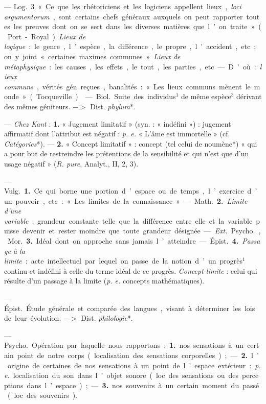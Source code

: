 \begin{itemize}[leftmargin=1cm, label=, itemsep=1pt]
— \si{Log.} 3 « Ce que les rhétoriciens et les logiciens appellent lieux,
{\it loci argumentorum}, sont certains chefs généraux auxquels on peut
rapporter toutes les preuves dont on se sert dans les diverses matières que
l’on traite » (Port-Royal). {\it Lieux de logique} : le genre, l’espèce, la
différence, le propre, l'accident, etc. ; on y joint « certaines maximes
communes ». {\it Lieux de métaphysique} : les causes, les effets, le tout,
les parties, etc. — D'où : {\it lieux communs}, vérités gén. reçues,
banalités : « Les lieux communs mènent le monde » (Tocqueville).

 — \si{Biol.} Suite des individus$^1$ de même espèce$^3$ dérivant
des mêmes géniteurs. $->$ Dist. {\it phylum}*.

 — {\it Chez Kant} : {\bf 1.} « Jugement limitatif » (syn. :
« indéfini ») : jugement affirmatif dont l’attribut est négatif : {\it p. e.}
« L’âme est immortelle » (cf. {\it Catégories}*). — {\bf 2.} « Concept
limitatif » : concept (tel celui de noumène*) « qui a pour but de restreindre
les prétentions de la sensibilité et qui n’est que d'un usage négatif »
({\it R. pure}, Analyt., II, 2, 3).

 — \si{Vulg.} {\bf 1.} Ce qui borne une portion d’espace ou de temps, l’exercice d’un pouvoir, etc. : « Les limites de la connaissance ».

— \si{Math.} {\bf 2.} {\it Limite d'une variable} : grandeur constante telle
que la différence entre elle et la variable puisse devenir et rester moindre
que toute grandeur désignée.

— {\it Ext.} \si{Psycho.}, \si{Mor.} {\bf 3.} Idéal dont on approche sans
jamais l’atteindre. — \si{Épist.} {\bf 4.} {\it Passage à la limite} : acte
intellectuel par lequel on passe de la notion d’un progrès$^1$ continu et
indéfini à celle du terme idéal de ce progrès. {\it Concept-limite} : celui
qui résulte d’un passage à la limite ({\it p. e.} concepts mathématiques).

 — \si{Épist.} Étude générale et comparée des langues,
visant à déterminer les lois de leur évolution.  $->$ Dist. {\it philologie}*.

 — \si{Psycho.} Opération par laquelle nous rapportons :
{\bf 1.} nos sensations à un certain point de notre corps (localisation des
sensations corporelles) ; — {\bf 2.} l’origine de certaines de nos sensations
à un point de l’espace extérieur : {\it p. e.} localisation du son dans
l’objet sonore (loc. des sensations ou des perceptions dans l’espace) ; —
{\bf 3.} nos souvenirs à un certain moment du passé (loc. des souvenirs).


\end{itemize}
